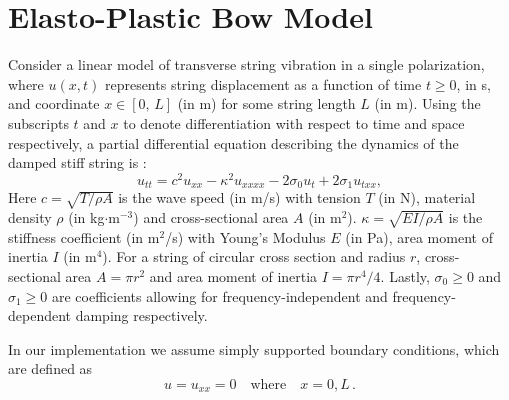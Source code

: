 \documentclass[twoside,a4paper,dvipsnames]{article}
\def\SWcomment[#1]{\textcolor{Green}{#1}}
\begin{document}
\section{Elasto-Plastic Bow Model}\label{sec:elasto}

Consider a linear model of transverse string vibration in a single polarization, where $u(x,t)$ represents string displacement as a function of time $t\geq 0$, in s, and coordinate $x\in[0,\,L]$ (in m) for some string length $L$ (in m). Using the subscripts $t$ and $x$ to denote differentiation with respect to time and space respectively, a partial differential equation describing the dynamics of the damped stiff string is \cite{Bilbao2009}:
\begin{equation}\label{eq:PDE}
    u_{tt} = c^2u_{xx}-\kappa^2u_{xxxx}-2\sigma_0u_t+2\sigma_1u_{txx},
\end{equation}
Here $c = \sqrt{T/\rho A}$ is the wave speed (in m/s) with tension $T$ (in N), material density $\rho$ (in kg$\cdot$m$^{-3}$) and cross-sectional area $A$ (in m$^2$). $\kappa = \sqrt{EI/\rho A}$ is the stiffness coefficient (in m$^2$/s) with Young's Modulus $E$ (in Pa), area moment of inertia $I$ (in m$^4$). For a string of circular cross section and radius $r$, cross-sectional area $A=\pi r^2$ and area moment of inertia $I=\pi r^4 /4$.  Lastly, $\sigma_0 \geq 0$ and $\sigma_1 \geq 0$ are coefficients allowing for frequency-independent and frequency-dependent damping respectively. 

In our implementation we assume simply supported boundary conditions, which are defined as
\begin{equation}
    u = u_{xx} = 0 \quad \text{where} \quad x = 0, L\, .
\end{equation}
\end{document}
